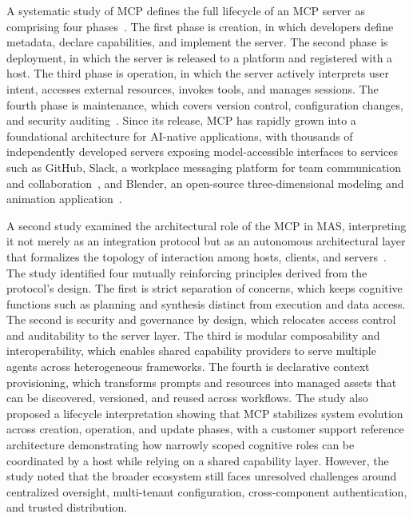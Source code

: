 \documentclass[
english,                 %
bibtex,                  %
includeExtraAbstracts, %
]{kththesis}
\numberwithin{listing}{chapter}
\begin{document}
A systematic study of \gls{MCP} defines the full lifecycle of an \gls{MCP} server as comprising four phases~\cite{hou_model_2026}. The first phase is creation, in which developers define metadata, declare capabilities, and implement the server. The second phase is deployment, in which the server is released to a platform and registered with a host. The third phase is operation, in which the server actively interprets user intent, accesses external resources, invokes tools, and manages sessions. The fourth phase is maintenance, which covers version control, configuration changes, and security auditing~\cite{hou_model_2026}. Since its release, \gls{MCP} has rapidly grown into a foundational architecture for \gls{AI}-native applications, with thousands of independently developed servers exposing model-accessible interfaces to services such as GitHub, Slack, a workplace messaging platform for team communication and collaboration~\cite{slack_technologies_llc_a_salesforce_company_slack_2026}, and Blender, an open-source three-dimensional modeling and animation application~\cite{blender_foundation_blender_2026}.

A second study examined the architectural role of the \gls{MCP} in \gls{MAS}, interpreting it not merely as an integration protocol but as an autonomous architectural layer that formalizes the topology of interaction among hosts, clients, and servers~\cite{zuykov_architectural_2026}. The study identified four mutually reinforcing principles derived from the protocol's design. The first is strict separation of concerns, which keeps cognitive functions such as planning and synthesis distinct from execution and data access. The second is security and governance by design, which relocates access control and auditability to the server layer. The third is modular composability and interoperability, which enables shared capability providers to serve multiple agents across heterogeneous frameworks. The fourth is declarative context provisioning, which transforms prompts and resources into managed assets that can be discovered, versioned, and reused across workflows. The study also proposed a lifecycle interpretation showing that \gls{MCP} stabilizes system evolution across creation, operation, and update phases, with a customer support reference architecture demonstrating how narrowly scoped cognitive roles can be coordinated by a host while relying on a shared capability layer. However, the study noted that the broader ecosystem still faces unresolved challenges around centralized oversight, multi-tenant configuration, cross-component authentication, and trusted distribution.
\end{document}
